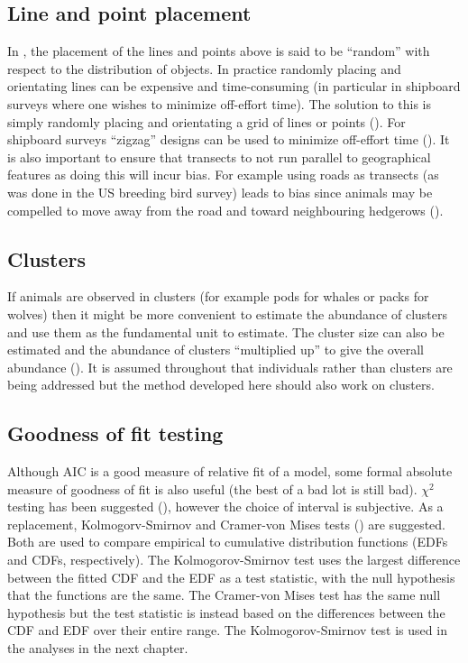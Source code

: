 \subsection{Line and point placement}
In , the placement of the lines and points above is said to be ``random'' with respect to the distribution of objects. In practice randomly placing and orientating lines can be expensive and time-consuming (in particular in shipboard surveys where one wishes to minimize off-effort time). The solution to this is simply randomly placing and orientating a grid of lines or points (\cite[p. 2]{IDS}). For shipboard surveys ``zigzag'' designs can be used to minimize off-effort time (\cite{strindberg04}). It is also important to ensure that transects to not run parallel to geographical features as doing this will incur bias. For example using roads as transects (as was done in the US breeding bird survey) leads to bias since animals may be compelled to move away from the road and toward neighbouring hedgerows (\cite[p. 18]{IDS}).

\subsection{Clusters}
If animals are observed in clusters (for example pods for whales or packs for wolves) then it might be more convenient to estimate the abundance of clusters and use them as the fundamental unit to estimate. The cluster size can also be estimated and the abundance of clusters ``multiplied up'' to give the overall abundance (\cite[p. 13]{IDS}). It is assumed throughout that individuals rather than clusters are being addressed but the method developed here should also work on clusters.

\subsection{Goodness of fit testing}
Although AIC is a good measure of relative fit of a model, some formal absolute measure of goodness of fit is also useful (the best of a bad lot is still bad). $\chi^2$ testing has been suggested (\cite[pp. 69-71]{IDS}), however the choice of interval is subjective. As a replacement, Kolmogorv-Smirnov and Cramer-von Mises tests (\cite[pp. 385-389]{ADS}) are suggested. Both are used to compare empirical to cumulative distribution functions (EDFs and CDFs, respectively). The Kolmogorov-Smirnov test uses the largest difference between the fitted CDF and the EDF as a test statistic, with the null hypothesis that the functions are the same. The Cramer-von Mises test has the same null hypothesis but the test statistic is instead based on the differences between the CDF and EDF over their entire range. The Kolmogorov-Smirnov test is used in the analyses in the next chapter.

